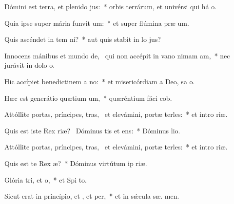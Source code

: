 \item Dómini est terra, et plenido jus:~* orbis terrárum, et univérsi qui há  o.
\item Quia ipse super mária funvit um:~* et super flúmina præ um.
\item Quis ascéndet in tem ni?~* aut quis stabit in lo  jus?
\item Innocens mánibus et mundo de,~\pscross{} qui non accépit in vano nimam am,~* nec jurávit in dolo  o.
\item Hic accípiet benedictinem a no:~* et misericórdiam a Deo, sa o.
\item Hæc est generátio quætium um,~* quæréntium fáci  cob.
\item Attóllite portas, príncipes, tras,~\pscross{} et elevámini, portæ terles:~* et intro  riæ.
\item Quis est iste Rex riæ?~\pscross{} Dóminus tis et ens:~* Dóminus   lio.
\item Attóllite portas, príncipes, tras,~\pscross{} et elevámini, portæ terles:~* et intro  riæ.
\item Quis est te Rex æ?~* Dóminus virtútum ip   riæ.
\item Glória tri, et o,~* et Spi to.
\item Sicut erat in princípio, et , et per,~* et in sǽcula sæ. men.
